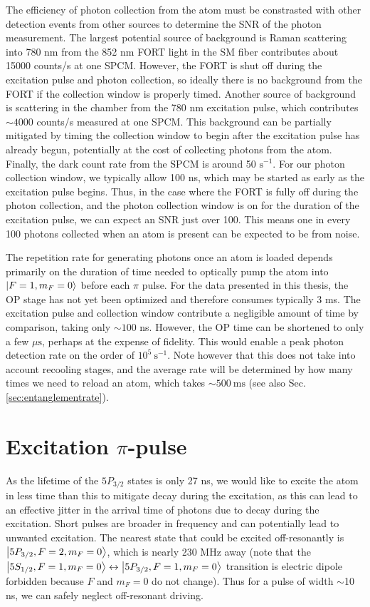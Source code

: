 The efficiency of photon collection from the atom must be constrasted with other detection events from other sources to determine the SNR of the photon measurement. The largest potential source of background is Raman scattering into 780 nm from the 852 nm FORT light in the SM fiber contributes about 15000 counts/s at one SPCM. However, the FORT is shut off during the excitation pulse and photon collection, so ideally there is no background from the FORT if the collection window is properly timed. Another source of background is scattering in the chamber from the 780 nm excitation pulse, which contributes $\sim4000$ counts/s measured at one SPCM. This background can be partially mitigated by timing the collection window to begin after the excitation pulse has already begun, potentially at the cost of collecting photons from the atom. Finally, the dark count rate from the SPCM is around 50 $\mathrm{s}^{-1}$. For our photon collection window, we typically allow 100 ns, which may be started as early as the excitation pulse begins. Thus, in the case where the FORT is fully off during the photon collection, and the photon collection window is on for the duration of the excitation pulse, we can expect an SNR just over 100. This means one in every 100 photons collected when an atom is present can be expected to be from noise.

The repetition rate for generating photons once an atom is loaded depends primarily on the duration of time needed to optically pump the atom into $\ket{F=1,m_F=0}$ before each $\pi$ pulse. For the data presented in this thesis, the OP stage has not yet been optimized and therefore consumes typically 3 ms. The excitation pulse and collection window contribute a negligible amount of time by comparison, taking only $\sim100$ ns. However, the OP time can be shortened to only a few $\mu \mathrm{s}$, perhaps at the expense of fidelity\cite{zhou2024long}. This would enable a peak photon detection rate on the order of $10^{5}~\mathrm{s}^{-1}$. Note however that this does not take into account recooling stages, and the average rate will be determined by how many times we need to reload an atom, which takes $\sim500~\mathrm{ms}$ (see also Sec. \ref{sec:entanglementrate}).

\section{Excitation $\pi$-pulse}
As the lifetime of the $5P_{3/2}$ states is only 27 ns, we would like to excite the atom in less time than this to mitigate decay during the excitation, as this can lead to an effective jitter in the arrival time of photons due to decay during the excitation. Short pulses are broader in frequency and can potentially lead to unwanted excitation. The nearest state that could be excited off-resonantly is $\ket{5P_{3/2},F=2,m_F=0}$, which is nearly 230 MHz away (note that the $\ket{5S_{1/2},F=1,m_F=0} \leftrightarrow \ket{5P_{3/2},F=1,m_F=0}$ transition is electric dipole forbidden because $F$ and $m_F=0$ do not change). Thus for a pulse of width $\sim$10 ns, we can safely neglect off-resonant driving.

